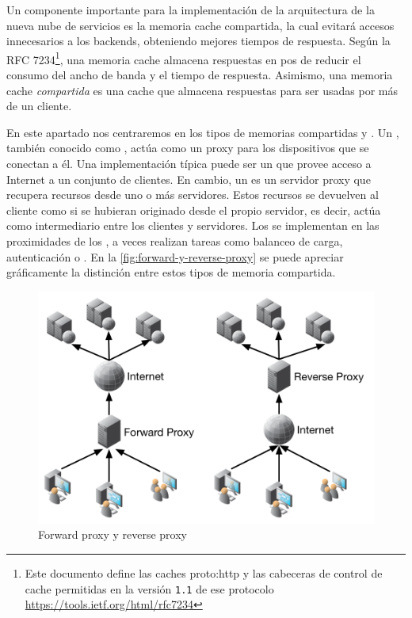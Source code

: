 Un componente importante para la implementación de la arquitectura de la nueva nube de servicios es la memoria cache compartida, la cual evitará accesos innecesarios a los backends, obteniendo mejores tiempos de respuesta.  Según la RFC 7234\footnote{Este documento define las caches \gls{proto:http} y las cabeceras de control de cache permitidas en la versión \texttt{1.1} de ese protocolo\\\url{https://tools.ietf.org/html/rfc7234}}, una memoria cache almacena respuestas en pos de reducir el consumo del ancho de banda y el tiempo de respuesta. Asimismo, una memoria cache \textit{compartida} es una cache que almacena respuestas para ser usadas por más de un cliente.

En este apartado nos centraremos en los tipos de memorias compartidas  y .  Un , también conocido como , actúa como un proxy para los dispositivos que se conectan a él.  Una implementación típica puede ser un  que provee acceso a Internet a un conjunto de clientes. En cambio, un  es un servidor proxy que recupera recursos desde uno o más servidores.  Estos recursos se devuelven al cliente como si se hubieran originado desde el propio servidor, es decir, actúa como intermediario entre los clientes y servidores.  Los  se implementan en las proximidades de los , a veces realizan tareas como balanceo de carga, autenticación o . En la \autoref{fig:forward-y-reverse-proxy}  se puede apreciar gráficamente la distinción entre estos tipos de memoria compartida.

\begin{figure}[H]
  \includegraphics[width=\linewidth]{src/images/03-capitulo-3/proxy-forward-reverse.png}
  \caption{Forward proxy y reverse proxy}
  \label{fig:forward-y-reverse-proxy}
\end{figure}

